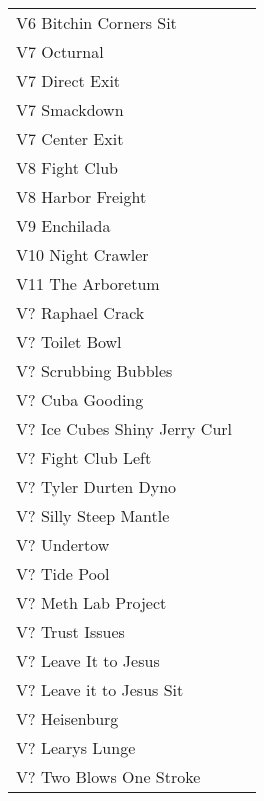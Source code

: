 \begin{center}
\begin{supertabular}{lr}
V6 Bitchin Corners Sit & \pageref{vr:Bitchin Corners Sit} \\
V7 Octurnal      & \pageref{rt:Octurnal} \\
V7 Direct Exit      & \pageref{vr:Direct Exit} \\
V7 Smackdown     & \pageref{rt:Smackdown} \\
V7 Center Exit     & \pageref{vr:Center Exit} \\
V8 Fight Club     & \pageref{rt:Fight Club} \\
V8 Harbor Freight & \pageref{vr:Harbor Freight} \\
V9 Enchilada    & \pageref{rt:Enchilada} \\
V10 Night Crawler & \pageref{rt:Night Crawler} \\
V11 The Arboretum & \pageref{rt:The Arboretum} \\
V? Raphael Crack & \pageref{rt:Raphael Crack} \\
V? Toilet Bowl & \pageref{rt:Toilet Bowl} \\
V? Scrubbing Bubbles & \pageref{rt:Scrubbing Bubbles} \\
V? Cuba Gooding & \pageref{rt:Cuba Gooding} \\
V? Ice Cubes Shiny Jerry Curl & \pageref{rt:Ice Cubes Shiny Jerry Curl} \\
V? Fight Club Left & \pageref{rt:Fight Club Left} \\
V? Tyler Durten Dyno & \pageref{vr:Tyler Durten Dyno} \\
V? Silly Steep Mantle & \pageref{rt:Silly Steep Mantle} \\
V? Undertow & \pageref{rt:Undertow} \\
V? Tide Pool & \pageref{rt:Tide Pool} \\
V? Meth Lab Project & \pageref{rt:Meth Lab Project} \\
V? Trust Issues & \pageref{rt:Trust Issues} \\
V? Leave It to Jesus & \pageref{rt:Leave It to Jesus} \\
V? Leave it to Jesus Sit & \pageref{vr:Leave it to Jesus Sit} \\
V? Heisenburg & \pageref{rt:Heisenburg} \\
V? Learys Lunge & \pageref{rt:Learys Lunge} \\
V? Two Blows One Stroke & \pageref{rt:Two Blows One Stroke} \\

\end{supertabular}
\end{center}
